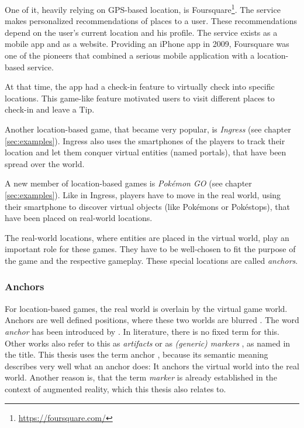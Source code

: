 One of it, heavily relying on GPS-based location, is Foursquare\footnote{\url{https://foursquare.com/}}. The service makes personalized recommendations of places to a user. These recommendations depend on the user's current location and his profile. The service exists as a mobile app and as a website. Providing an iPhone app in 2009, Foursquare was one of the pioneers that combined a serious mobile application with a location-based service.

At that time, the app had a check-in feature to virtually check into specific locations. This game-like feature motivated users to visit different places to check-in and leave a Tip.

Another location-based game, that became very popular, is \emph{Ingress} (see chapter \ref{sec:examples}). Ingress also uses the smartphones of the players to track their location and let them conquer virtual entities (named portals), that have been spread over the world.

A new member of location-based games is \emph{Pok\'{e}mon GO} (see chapter \ref{sec:examples}). Like in Ingress, players have to move in the real world, using their smartphone to discover virtual objects (like Pok\'{e}mons or Pok\'{e}stops), that have been placed on real-world locations.

The real-world locations, where entities are placed in the virtual world, play an important role for these games. They have to be well-chosen to fit the purpose of the game and the respective gameplay. These special locations are called \emph{anchors}.

\subsubsection{Anchors}\label{sec:anchorsStateOfTheArt}
For location-based games, the real world is overlain by the virtual game world. Anchors are well defined positions, where these two worlds are blurred \citep{hock2014augmented}. The word \emph{anchor} has been introduced by \citeauthor{hock2014augmented}. In literature, there is no fixed term for this. Other works also refer to this as \emph{artifacts} \citep{reid2008design} or as \emph{(generic) markers} \citep{matyas2008designing}, as named in the title. This thesis uses the term anchor \citep{hock2014augmented}, because its semantic meaning describes very well what an anchor does: It anchors the virtual world into the real world. Another reason is, that the term \emph{marker} is already established in the context of augmented reality, which this thesis also relates to.

